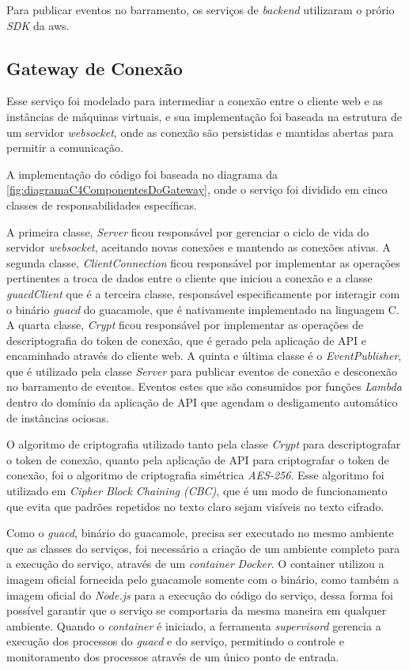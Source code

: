 Para publicar eventos no barramento, os serviços de \textit{backend} utilizaram o prório \textit{SDK} da \gls{aws}.

\subsection{Gateway de Conexão}
\label{subsec:gatewayDeConexao}

Esse serviço foi modelado para intermediar a conexão entre o cliente web e as instâncias de máquinas virtuais, e sua implementação foi baseada na estrutura de um servidor \textit{websocket}, onde as conexão são persistidas e mantidas abertas para permitir a comunicação.

A implementação do código foi baseada no diagrama da \autoref{fig:diagramaC4ComponentesDoGateway}, onde o serviço foi dividido em cinco classes de responsabilidades específicas.

A primeira classe, \textit{Server} ficou responsável por gerenciar o ciclo de vida do servidor \textit{websocket}, aceitando novas conexões e mantendo as conexões ativas. A segunda classe, \textit{ClientConnection} ficou responsável por implementar as operações pertinentes a troca de dados entre o cliente que iniciou a conexão e a classe \textit{guacdClient} que é a terceira classe, responsável especificamente por interagir com o binário \textit{guacd} do \gls{guacamole}, que é nativamente implementado na linguagem C. A quarta classe, \textit{Crypt} ficou responsável por implementar as operações de descriptografia do token de conexão, que é gerado pela aplicação de API e encaminhado através do cliente web. A quinta e última classe é o \textit{EventPublisher}, que é utilizado pela classe \textit{Server} para publicar eventos de conexão e desconexão no barramento de eventos. Eventos estes que são consumidos por funções \textit{Lambda} dentro do domínio da aplicação de API que agendam o desligamento automático de instâncias ociosas.

O algoritmo de criptografia utilizado tanto pela classe \textit{Crypt} para descriptografar o token de conexão, quanto pela aplicação de API para criptografar o token de conexão, foi o algoritmo de criptografia simétrica \textit{AES-256}. Esse algoritmo foi utilizado em \textit{Cipher Block Chaining (CBC)}, que é um modo de funcionamento que evita que padrões repetidos no texto claro sejam visíveis no texto cifrado.

Como o \textit{guacd}, binário do \gls{guacamole}, precisa ser executado no mesmo ambiente que as classes do serviços, foi necessário a criação de um ambiente completo para a execução do serviço, através de um \textit{container} \textit{Docker}. O container utilizou a imagem oficial fornecida pelo \gls{guacamole} somente com o binário, como também a imagem oficial do \textit{Node.js} para a execução do código do serviço, dessa forma foi possível garantir que o serviço se comportaria da mesma maneira em qualquer ambiente. Quando o \textit{container} é iniciado, a ferramenta \textit{supervisord} gerencia a execução dos processos do \textit{guacd} e do serviço, permitindo o controle e monitoramento dos processos através de um único ponto de entrada.

